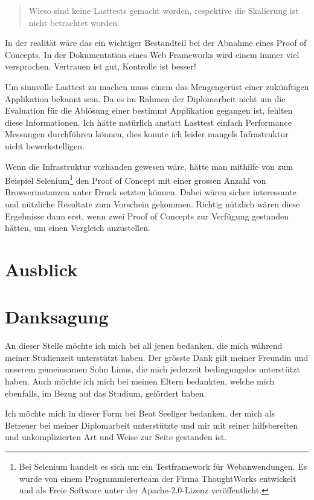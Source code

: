\begin{quote}\begin{itshape}Wieso sind keine Lasttests gemacht worden,
respektive die Skalierung ist nicht betrachtet worden.\end{itshape}\end{quote}

In der realität wäre das ein wichtiger Bestandteil bei der Abnahme eines Proof
of Concepts. In der Dokumentation eines Web Frameworks wird einem immer viel
versprochen. Vertrauen ist gut, Kontrolle ist besser! 

Um sinnvolle Lasttest zu machen muss einem das Mengengerüst einer zukünftigen
Applikation bekannt sein. Da es im Rahmen der Diplomarbeit nicht um die
Evaluation für die Ablösung einer bestimmt Applikation gegangen ist, fehlten
diese Informationen. Ich hätte natürlich anstatt Lasttest einfach Performance
Messungen durchführen können, dies konnte ich leider mangels Infrastruktur nicht
bewerkstelligen.

Wenn die Infrastruktur vorhanden gewesen wäre, hätte man mithilfe von
zum Beispiel Selenium\footnote{Bei Selenium handelt es sich um ein
Testframework für Webanwendungen. Es wurde von einem Programmiererteam der
Firma ThoughtWorks entwickelt und als Freie Software unter der
Apache-2.0-Lizenz veröffentlicht.} den Proof of Concept mit einer grossen Anzahl
von Browserinstanzen unter Druck setzten können. Dabei wären sicher interessante
und nützliche Resultate zum Vorschein gekommen. Richtig nützlich wären diese
Ergebnisse dann erst, wenn zwei Proof of Concepts zur Verfügung gestanden
hätten, um einen Vergleich anzustellen.

\section{Ausblick}

\section{Danksagung}

An dieser Stelle möchte ich mich bei all jenen bedanken, die mich während
meiner Studienzeit unterstützt haben. Der grösste Dank gilt meiner Freundin und
unserem gemeinsamen Sohn Linus, die mich jederzeit bedingungslos unterstützt
haben. Auch möchte ich mich bei meinen Eltern bedankten, welche mich
ebenfalls, im Bezug auf das Studium, gefördert haben.
  
Ich möchte mich in dieser Form bei Beat Seeliger bedanken, der mich als
Betreuer bei meiner Diplomarbeit unterstützte und mir mit seiner hilfsbereiten
und unkomplizierten Art und Weise zur Seite gestanden ist.
  
